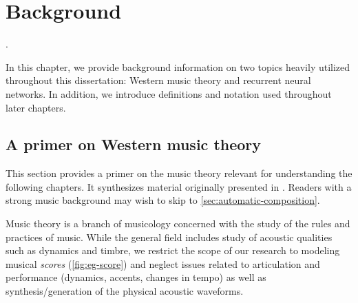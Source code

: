 \chapter{Background}

\ifpdf
    \graphicspath{{Chapter2/Figs/Raster/}{Chapter2/Figs/PDF/}{Chapter2/Figs/}}
\else
    \graphicspath{{Chapter2/Figs/Vector/}{Chapter2/Figs/}}
\fi

.

In this chapter, we provide background information on two topics heavily
utilized throughout this dissertation: Western music theory and recurrent
neural networks. In addition, we introduce definitions and notation used
throughout later chapters.

\section{A primer on Western music theory}

This section provides a primer on the music theory relevant for understanding
the following chapters. It synthesizes material originally presented in
\citet{franklin2006recurrent,nagler2014schubot,quick2014kulitta,freedman2015correlational}.
Readers with a strong music background may wish to skip to
\vref{sec:automatic-composition}.

Music theory is a branch of musicology concerned with the study of the rules
and practices of music. While the general field includes study of acoustic
qualities such as dynamics and timbre, we restrict the scope of our research to
modeling musical \emph{scores} (\eg \cref{fig:eg-score}) and neglect issues
related to articulation and performance (\eg dynamics, accents, changes in
tempo) as well as synthesis/generation of the physical acoustic waveforms.

